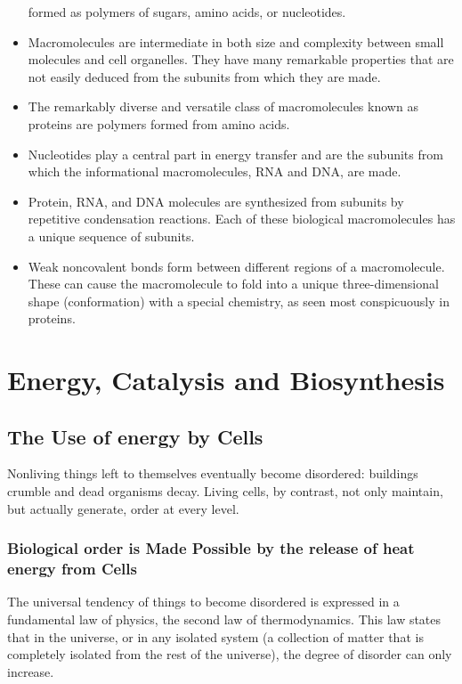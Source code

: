 \begin{itemize}
formed as polymers of sugars, amino acids, or nucleotides.
\item Macromolecules are intermediate in both size and complexity between
small molecules and cell organelles. They have many remarkable
properties that are not easily deduced from the subunits from which
they are made.
\item The remarkably diverse and versatile class of macromolecules known
as proteins are polymers formed from amino acids.
\item Nucleotides play a central part in energy transfer and are the subunits
from which the informational macromolecules, RNA and DNA, are made.
\item Protein, RNA, and DNA molecules are synthesized from subunits by
repetitive condensation reactions. Each of these biological macromolecules
has a unique sequence of subunits.
\item Weak noncovalent bonds form between different regions of a macromolecule.
These can cause the macromolecule to fold into a unique
three-dimensional shape (conformation) with a special chemistry, as
seen most conspicuously in proteins.
\end{itemize}

\chapter{Energy, Catalysis and Biosynthesis}

\section{The Use of energy by Cells}

Nonliving things left to themselves eventually become disordered: buildings
crumble and dead organisms decay. Living cells, by contrast, not
only maintain, but actually generate, order at every level.

\subsection{Biological order is Made Possible by the release of heat energy from Cells}

The universal tendency of things to become disordered is expressed in a
fundamental law of physics, the second law of thermodynamics. This law
states that in the universe, or in any isolated system (a collection of matter
that is completely isolated from the rest of the universe), the degree
of disorder can only increase.

